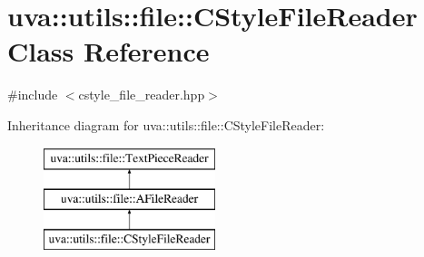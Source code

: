\hypertarget{classuva_1_1utils_1_1file_1_1_c_style_file_reader}{}\section{uva\+:\+:utils\+:\+:file\+:\+:C\+Style\+File\+Reader Class Reference}
\label{classuva_1_1utils_1_1file_1_1_c_style_file_reader}


{\ttfamily \#include $<$cstyle\+\_\+file\+\_\+reader.\+hpp$>$}

Inheritance diagram for uva\+:\+:utils\+:\+:file\+:\+:C\+Style\+File\+Reader\+:\begin{figure}[H]
\begin{center}
\leavevmode
\includegraphics[height=3.000000cm]{classuva_1_1utils_1_1file_1_1_c_style_file_reader}
\end{center}
\end{figure}
